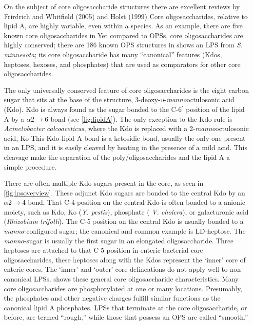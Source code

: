     On the subject of core oligosaccharide structures there are excellent reviews by Frirdrich and Whitfield (2005) and Holst (1999)
    Core oligosaccharides, relative to lipid A, are highly variable, even within a species. As an example, there are five known core oligosaccharides in \ecoli{} Yet compared to \acp{OPS}, core oligosaccharides are highly conserved; there are 186 known \ac{OPS} structures in \ecoli{}  shows an \ac{LPS} from \textit{S. minnesota}; its core oligosaccharide has many ``canonical'' features (\eg Kdos, heptoses, hexoses, and phosphates) that are used as comparators for other core oligosaccharides.

 The only universally conserved feature of core oligosaccharides is the eight carbon sugar that sits at the base of the structure, 3-deoxy-\textsc{d}-\textit{manno}octulosonic acid (Kdo). Kdo is always found as the sugar bonded to the C-6$^\prime$ position of the lipid A by a $\alpha$2$\rightarrow$6 bond (see \cref{fig:lipidA}).  The only exception to the Kdo rule is \textit{Acinetobacter calcoaceticus}, where the Kdo is replaced with a 2-\textit{manno}octulosonic acid, Ko  This Kdo-lipid A bond is a ketosidic bond, usually the only one present in an \ac{LPS}, and it is easily cleaved by heating in the presence of a mild acid. This cleavage make the separation of the poly/oligosaccharides and the lipid A a simple procedure.

There are often multiple Kdo sugars present in the core, as seen in \cref{fig:lpsoverview}. These adjunct Kdo sugars are bonded to the central Kdo by an $\alpha$2$\rightarrow$4 bond. That C-4 position on the central Kdo is often bonded to a anionic moiety, such as Kdo, Ko (\textit{Y. pestis}), phosphate ( \textit{V. cholera}), or galacturonic acid (\textit{Rhizobium trifolli}). The C-5 position on the central Kdo is usually bonded to a \textit{manno}-configured sugar; the canonical and common example is LD-heptose. The \textit{manno}-sugar is usually the first sugar in an elongated oligosaccharide. Three heptoses are attached to that C-5 position in enteric bacterial core oligosaccharides, these heptoses along with the Kdos represent the `inner' core of enteric cores. The `inner' and `outer' core delineations do not apply well to non canonical \acp{LPS}.  shows these general core oligosaccharide characteristics. Many core oligosaccharides are phosphorylated at one or many locations. Presumably, the phosphates and other negative charges fulfill similar functions as the canonical lipid A phosphates. \Acp{LPS} that terminate at the core oligosaccharide, or before, are termed ``rough,'' while  those that possess an \ac{OPS} are called ``smooth.''


